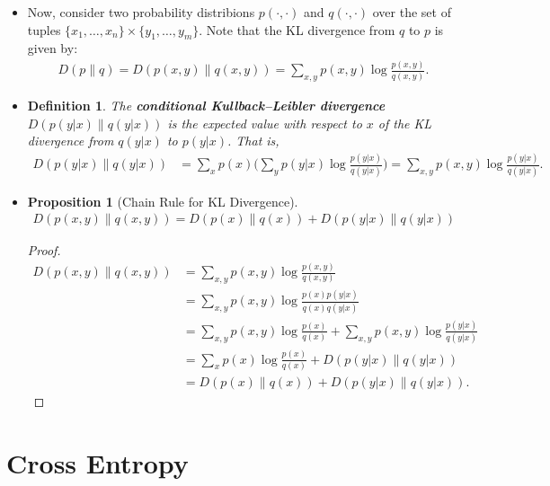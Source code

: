 \documentclass[10pt]{article}
\newtheorem{definition}[lemma]{Definition}
\newtheorem{proposition}[lemma]{Proposition}
\begin{document}
\begin{itemize}
 	\item Now, consider two probability distribions $p(\cdot,\cdot)$ and $q(\cdot,\cdot)$ over the set of tuples $\{x_1, \dotsc, x_n \} \times \{y_1, \dotsc, y_m \}$. Note that the KL divergence from $q$ to $p$ is given by:
 	\begin{align*}
 		D(p\|q) = D(p(x,y)\|q(x,y)) = \sum_{x,y} p(x,y) \log \frac{p(x,y)}{q(x,y)}.
 	\end{align*}

 	\item \begin{definition}
 		The \textbf{conditional Kullback--Leibler divergence} $D(p(y|x)\|q(y|x))$ is the expected value with respect to $x$ of the KL divergence from $q(y|x)$ to $p(y|x)$. That is,
 		\begin{align*}
 			D(p(y|x)\|q(y|x))
 			&= \sum_{x} p(x) \bigg( \sum_{y} p(y|x) \log \frac{p(y|x)}{q(y|x)} \bigg)
 			= \sum_{x,y} p(x,y) \log \frac{p(y|x)}{q(y|x)}.
 		\end{align*}
 	\end{definition}

 	\item \begin{proposition}[Chain Rule for KL Divergence]
 		\begin{align*}
 			D(p(x,y)\|q(x,y))
 			= D(p(x)\|q(x)) + D(p(y|x)\|q(y|x)) 
 		\end{align*} 		
 	\end{proposition}
 	\begin{proof}
 	\begin{align*}
 		D(p(x,y)\|q(x,y))
 		&= \sum_{x,y} p(x,y) \log \frac{p(x,y)}{q(x,y)} \\
 		&= \sum_{x,y} p(x,y) \log \frac{p(x)p(y|x)}{q(x)q(y|x)} \\
 		&= \sum_{x,y} p(x,y) \log \frac{p(x)}{q(x)} 
 		   + \sum_{x,y} p(x,y) \log \frac{p(y|x)}{q(y|x)}\\
 		&= \sum_{x} p(x) \log \frac{p(x)}{q(x)} 
 		   + D(p(y|x)\|q(y|x))\\
 		&= D(p(x)\|q(x)) + D(p(y|x)\|q(y|x)).
 	\end{align*}	
 	\end{proof} 	
  \end{itemize}

  \section{Cross Entropy}
\end{document}
